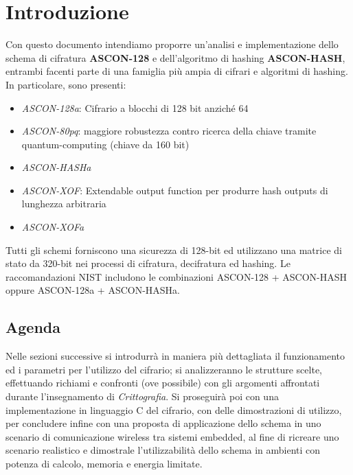 \section{Introduzione}
Con questo documento intendiamo proporre un'analisi e implementazione dello schema di cifratura \textbf{ASCON-128} e dell'algoritmo di hashing \textbf{ASCON-HASH}, entrambi facenti parte di una famiglia più ampia di cifrari e algoritmi di hashing. In particolare, sono presenti: 
\begin{itemize}
    \item \textsl{ASCON-128a}: Cifrario a blocchi di 128 bit anziché 64
    \item \textsl{ASCON-80pq}: maggiore robustezza contro ricerca della chiave tramite quantum-computing (chiave da 160 bit)
    \item \textsl{ASCON-HASHa}
    \item \textsl{ASCON-XOF}: Extendable output function per produrre hash outputs di lunghezza arbitraria
    \item \textsl{ASCON-XOFa}
\end{itemize}
Tutti gli schemi forniscono una sicurezza di 128-bit ed utilizzano una matrice di stato da 320-bit nei processi di cifratura, decifratura ed hashing. Le raccomandazioni NIST includono le combinazioni ASCON-128 + ASCON-HASH oppure ASCON-128a + ASCON-HASHa.
\subsection{Agenda}
Nelle sezioni successive si introdurrà in maniera più dettagliata il funzionamento ed i parametri per l'utilizzo del cifrario; si analizzeranno le strutture scelte, effettuando richiami e confronti (ove possibile) con gli argomenti affrontati durante l'insegnamento di \textsl{Crittografia}. Si proseguirà poi con una implementazione in linguaggio C del cifrario, con delle dimostrazioni di utilizzo, per concludere infine con una proposta di applicazione dello schema in uno scenario di comunicazione wireless tra sistemi embedded, al fine di ricreare uno scenario realistico e dimostrale l'utilizzabilità dello schema in ambienti con potenza di calcolo, memoria e energia limitate. 

\newpage